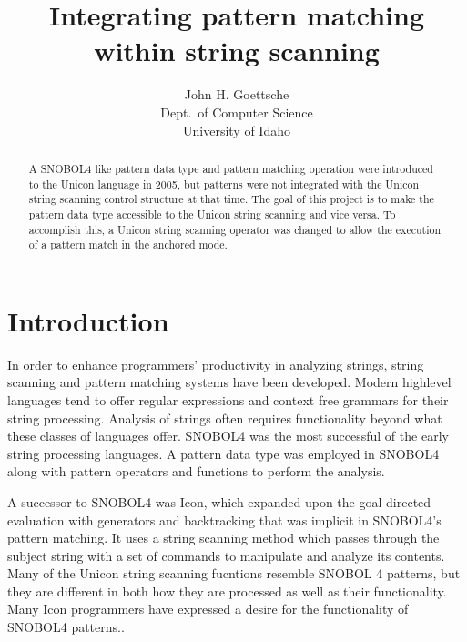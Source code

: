 \documentclass{article}
\begin{document}
\linespread{1}
\title{Integrating pattern matching within string scanning}
\author{John H. Goettsche\\
  Dept.\ of Computer Science\\
  University of Idaho}

\maketitle

\begin{abstract}
A SNOBOL4 like pattern data type and pattern matching operation were introduced to the Unicon language in 2005, but patterns were not integrated with the Unicon string scanning control structure at that time.  The goal of this project is to make the pattern data type accessible to the Unicon string scanning and vice versa.  To accomplish this, a Unicon string scanning operator was changed to allow the execution of a pattern match in the anchored mode. 

\end{abstract}

\pagebreak
\linespread{1}
\tableofcontents

\pagebreak
\section{Introduction}
In order to enhance programmers' productivity in analyzing strings, string scanning and pattern matching systems have been developed.  Modern highlevel languages tend to offer regular expressions and context free grammars for their string processing.  Analysis of strings often requires functionality beyond what these classes of languages offer.  SNOBOL4 was the most successful of the early string processing languages. \cite{Snobol, Gaikaiwari2005}  A pattern data type was employed in SNOBOL4 along with pattern operators and functions to perform the analysis.

A successor to SNOBOL4 was Icon, which expanded upon the goal directed evaluation with generators and backtracking that was implicit in SNOBOL4's pattern matching.\cite{GriswoldIcon, Gaikaiwari2005}  It uses a string scanning method which passes through the subject string with a set of commands to manipulate and analyze its contents.  Many of the Unicon string scanning fucntions resemble SNOBOL 4 patterns, but they are different in both how they are processed as well as their functionality.  Many Icon programmers have expressed a desire for the functionality of SNOBOL4 patterns.\cite{Griswold1980}.
\end{document}
